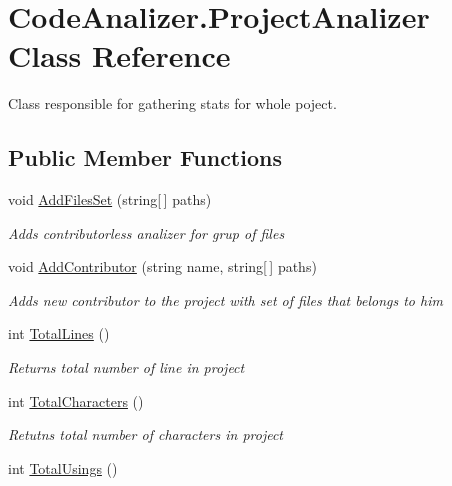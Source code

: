 \hypertarget{class_code_analizer_1_1_project_analizer}{}\section{Code\+Analizer.\+Project\+Analizer Class Reference}
\label{class_code_analizer_1_1_project_analizer}


Class responsible for gathering stats for whole poject.  


\subsection*{Public Member Functions}
\begin{DoxyCompactItemize}
\item 
void \mbox{\hyperlink{class_code_analizer_1_1_project_analizer_a4ed8fe8129186288a99dedd7b4966b2b}{Add\+Files\+Set}} (string\mbox{[}$\,$\mbox{]} paths)
\begin{DoxyCompactList}\small\item\em Adds contributorless analizer for grup of files \end{DoxyCompactList}\item 
void \mbox{\hyperlink{class_code_analizer_1_1_project_analizer_a211cc82430d4b716fde6425c3d919be3}{Add\+Contributor}} (string name, string\mbox{[}$\,$\mbox{]} paths)
\begin{DoxyCompactList}\small\item\em Adds new contributor to the project with set of files that belongs to him \end{DoxyCompactList}\item 
int \mbox{\hyperlink{class_code_analizer_1_1_project_analizer_aad0869b232a62de023d48dda1edb9766}{Total\+Lines}} ()
\begin{DoxyCompactList}\small\item\em Returns total number of line in project \end{DoxyCompactList}\item 
int \mbox{\hyperlink{class_code_analizer_1_1_project_analizer_a8e4045d90ae317a8172e3ee5236fb0f6}{Total\+Characters}} ()
\begin{DoxyCompactList}\small\item\em Retutns total number of characters in project \end{DoxyCompactList}\item 
int \mbox{\hyperlink{class_code_analizer_1_1_project_analizer_a6b4d14436cbf5a7bdfe24870fe2209d7}{Total\+Usings}} ()

\end{DoxyCompactItemize}

